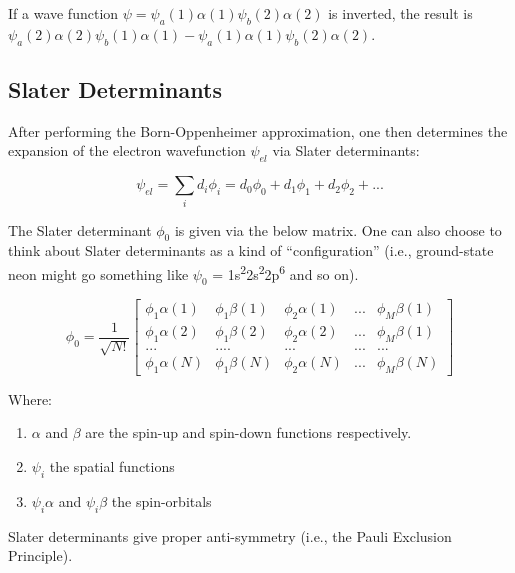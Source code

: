 \documentclass[
  letterpaper,
  DIV=11,
  numbers=noendperiod]{scrreprt}
\providecommand{\tightlist}{%
  \setlength{\itemsep}{0pt}\setlength{\parskip}{0pt}}\usepackage{longtable,booktabs,array}
\begin{document}
If a wave function \(\psi = \psi_a(1)\alpha(1)\psi_b(2)\alpha(2)\) is
inverted, the result is
\(\psi_a(2)\alpha(2)\psi_b(1)\alpha(1) - \psi_a(1)\alpha(1)\psi_b(2)\alpha(2)\).

\hypertarget{slater-determinants}{%
\subsection{Slater Determinants}\label{slater-determinants}}

After performing the Born-Oppenheimer approximation, one then determines
the expansion of the electron wavefunction \(\psi_{el}\) via Slater
determinants:

\begin{equation}
  \psi_{el} = \sum_id_i\phi_i = d_0\phi_0 + d_1\phi_1 + d_2\phi_2 + ...
\end{equation}

The Slater determinant \(\phi_0\) is given via the below matrix. One can
also choose to think about Slater determinants as a kind of
``configuration'' (i.e., ground-state neon might go something like
\(\psi_0\) =
1s\textsuperscript{2}2s\textsuperscript{2}2p\textsuperscript{6} and so
on).

\begin{equation}
  \phi_0 = \frac{1}{\sqrt{N!}}\left[
  \begin{matrix}
    \phi_1\alpha(1) & \phi_1\beta(1) & \phi_2\alpha(1) & ... & \phi_M\beta(1) \\
    \phi_1\alpha(2) & \phi_1\beta(2) & \phi_2\alpha(2) & ... & \phi_M\beta(1) \\ 
    ... & .... & ... & ... & ... \\ 
    \phi_1\alpha(N) & \phi_1\beta(N) & \phi_2\alpha(N) & ... & \phi_M\beta(N)    
  \end{matrix}
  \right]
\end{equation}

Where:

\begin{enumerate}
\def\labelenumi{\arabic{enumi}.}
\tightlist
\item
  \(\alpha\) and \(\beta\) are the spin-up and spin-down functions
  respectively.
\item
  \(\psi_i\) the spatial functions
\item
  \(\psi_i\alpha\) and \(\psi_i\beta\) the spin-orbitals
\end{enumerate}

Slater determinants give proper anti-symmetry (i.e., the Pauli Exclusion
Principle).
\end{document}

